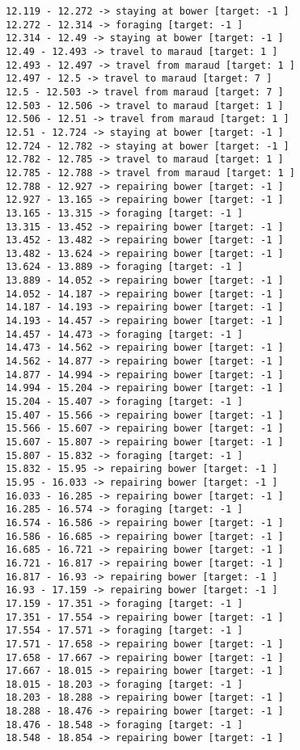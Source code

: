 \documentclass[11pt]{article}
\begin{document}
\begin{Verbatim}[commandchars=\\\{\}]
12.119 - 12.272 -> staying at bower [target: -1 ]
12.272 - 12.314 -> foraging [target: -1 ]
12.314 - 12.49 -> staying at bower [target: -1 ]
12.49 - 12.493 -> travel to maraud [target: 1 ]
12.493 - 12.497 -> travel from maraud [target: 1 ]
12.497 - 12.5 -> travel to maraud [target: 7 ]
12.5 - 12.503 -> travel from maraud [target: 7 ]
12.503 - 12.506 -> travel to maraud [target: 1 ]
12.506 - 12.51 -> travel from maraud [target: 1 ]
12.51 - 12.724 -> staying at bower [target: -1 ]
12.724 - 12.782 -> staying at bower [target: -1 ]
12.782 - 12.785 -> travel to maraud [target: 1 ]
12.785 - 12.788 -> travel from maraud [target: 1 ]
12.788 - 12.927 -> repairing bower [target: -1 ]
12.927 - 13.165 -> repairing bower [target: -1 ]
13.165 - 13.315 -> foraging [target: -1 ]
13.315 - 13.452 -> repairing bower [target: -1 ]
13.452 - 13.482 -> repairing bower [target: -1 ]
13.482 - 13.624 -> repairing bower [target: -1 ]
13.624 - 13.889 -> foraging [target: -1 ]
13.889 - 14.052 -> repairing bower [target: -1 ]
14.052 - 14.187 -> repairing bower [target: -1 ]
14.187 - 14.193 -> repairing bower [target: -1 ]
14.193 - 14.457 -> repairing bower [target: -1 ]
14.457 - 14.473 -> foraging [target: -1 ]
14.473 - 14.562 -> repairing bower [target: -1 ]
14.562 - 14.877 -> repairing bower [target: -1 ]
14.877 - 14.994 -> repairing bower [target: -1 ]
14.994 - 15.204 -> repairing bower [target: -1 ]
15.204 - 15.407 -> foraging [target: -1 ]
15.407 - 15.566 -> repairing bower [target: -1 ]
15.566 - 15.607 -> repairing bower [target: -1 ]
15.607 - 15.807 -> repairing bower [target: -1 ]
15.807 - 15.832 -> foraging [target: -1 ]
15.832 - 15.95 -> repairing bower [target: -1 ]
15.95 - 16.033 -> repairing bower [target: -1 ]
16.033 - 16.285 -> repairing bower [target: -1 ]
16.285 - 16.574 -> foraging [target: -1 ]
16.574 - 16.586 -> repairing bower [target: -1 ]
16.586 - 16.685 -> repairing bower [target: -1 ]
16.685 - 16.721 -> repairing bower [target: -1 ]
16.721 - 16.817 -> repairing bower [target: -1 ]
16.817 - 16.93 -> repairing bower [target: -1 ]
16.93 - 17.159 -> repairing bower [target: -1 ]
17.159 - 17.351 -> foraging [target: -1 ]
17.351 - 17.554 -> repairing bower [target: -1 ]
17.554 - 17.571 -> foraging [target: -1 ]
17.571 - 17.658 -> repairing bower [target: -1 ]
17.658 - 17.667 -> repairing bower [target: -1 ]
17.667 - 18.015 -> repairing bower [target: -1 ]
18.015 - 18.203 -> foraging [target: -1 ]
18.203 - 18.288 -> repairing bower [target: -1 ]
18.288 - 18.476 -> repairing bower [target: -1 ]
18.476 - 18.548 -> foraging [target: -1 ]
18.548 - 18.854 -> repairing bower [target: -1 ]

\end{Verbatim}
\end{document}
